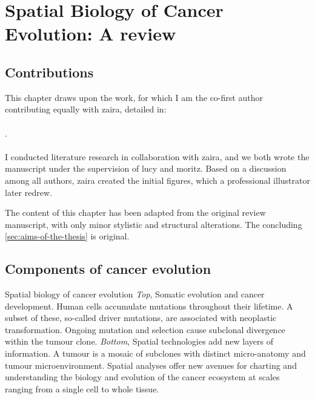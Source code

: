 \chapter{Spatial Biology of Cancer Evolution: A review}
\label{sec:chapter-introduction}

\section*{Contributions}

This chapter draws upon the work, for which I am the co-first author contributing equally with \ac{zaira}, detailed in:
\\~\\
.
\\~\\
I conducted literature research in collaboration with \ac{zaira}, and we both wrote the manuscript under the supervision of \ac{lucy} and \ac{moritz}. Based on a discussion among all authors, \ac{zaira} created the initial figures, which a professional illustrator later redrew.

The content of this chapter has been adapted from the original review manuscript, with only minor stylistic and structural alterations. The concluding \cref{sec:aims-of-the-thesis} is original.

\section{Components of cancer evolution}

    {Spatial biology of cancer evolution \parencite{Seferbekova2023-wg}}
    {\emph{Top}, Somatic evolution and cancer development. Human cells accumulate mutations throughout their lifetime. A subset of these, so-called driver mutations, are associated with neoplastic transformation. Ongoing mutation and selection cause subclonal divergence within the tumour clone. \emph{Bottom}, Spatial technologies add new layers of information. A tumour is a mosaic of subclones with distinct micro-anatomy and tumour microenvironment. Spatial analyses offer new avenues for charting and understanding the biology and evolution of the cancer ecosystem at scales ranging from a single cell to whole tissue.}



